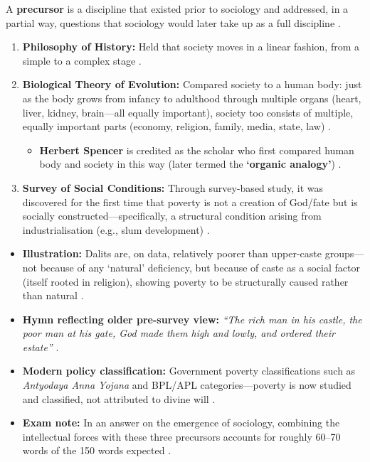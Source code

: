 \begin{KeyConcept}
A \textbf{precursor} is a discipline that existed prior to sociology and addressed, in a partial way, questions that sociology would later take up as a full discipline .
\begin{enumerate}
    \item \textbf{Philosophy of History:} Held that society moves in a linear fashion, from a simple to a complex stage .
    \item \textbf{Biological Theory of Evolution:} Compared society to a human body: just as the body grows from infancy to adulthood through multiple organs (heart, liver, kidney, brain---all equally important), society too consists of multiple, equally important parts (economy, religion, family, media, state, law) .
    \begin{itemize}
        \item \textbf{Herbert Spencer} is credited as the scholar who first compared human body and society in this way (later termed the \textbf{`organic analogy'}) .
    \end{itemize}
    \item \textbf{Survey of Social Conditions:} Through survey-based study, it was discovered for the first time that poverty is not a creation of God/fate but is socially constructed---specifically, a structural condition arising from industrialisation (e.g., slum development) .
\end{enumerate}
\end{KeyConcept}

\begin{ExampleBox}
\begin{itemize}
    \item \textbf{Illustration:} Dalits are, on data, relatively poorer than upper-caste groups---not because of any `natural' deficiency, but because of caste as a social factor (itself rooted in religion), showing poverty to be structurally caused rather than natural .
    \item \textbf{Hymn reflecting older pre-survey view:} \textit{``The rich man in his castle, the poor man at his gate, God made them high and lowly, and ordered their estate''} .
    \item \textbf{Modern policy classification:} Government poverty classifications such as \textit{Antyodaya Anna Yojana} and BPL/APL categories---poverty is now studied and classified, not attributed to divine will .
    \item \textbf{Exam note:} In an answer on the emergence of sociology, combining the intellectual forces with these three precursors accounts for roughly 60--70 words of the 150 words expected .
\end{itemize}
\end{ExampleBox}

